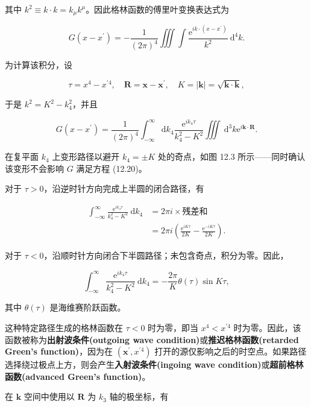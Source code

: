 其中
$k^{2} \equiv k \cdot k = k_{\mu} k^{\mu}$。因此格林函数的傅里叶变换表达式为

\begin{equation}\label{eq:12.21} 
 G\left(x-x^{\prime}\right)=-\frac{1}{(2 \pi)^{4}} \iiint \int \frac{\mathrm{e}^{i k \cdot\left(x-x^{\prime}\right)}}{k^{2}} \mathrm{~d}^{4} k. 
 \end{equation}

为计算该积分，设

$$
\tau=x^{4}-x^{\prime 4}, \quad \mathbf{R}=\mathbf{x}-\mathbf{x}^{\prime}, \quad K=|\mathbf{k}|=\sqrt{\mathbf{k} \cdot \mathbf{k}},
$$

于是 $k^{2}=K^{2}-k_{4}^{2}$，并且

$$
G\left(x-x^{\prime}\right)=\frac{1}{(2 \pi)^{4}} \int_{-\infty}^{\infty} \mathrm{d} k_{4} \frac{\mathrm{e}^{i k_{4} \tau}}{k_{4}^{2}-K^{2}} \iiint \mathrm{~d}^{3} k \mathrm{e}^{i \mathbf{k} \cdot \mathbf{R}}.
$$

在复平面 $k_{4}$ 上变形路径以避开 $k_{4}=\pm K$ 处的奇点，如图 12.3
所示------同时确认该变形不会影响 $G$ 满足方程 (12.20)。

对于 $\tau>0$，沿逆时针方向完成上半圆的闭合路径，有

$$
\begin{aligned}
\int_{-\infty}^{\infty} \frac{\mathrm{e}^{i k_{4} \tau}}{k_{4}^{2}-K^{2}} \mathrm{~d} k_{4} & =2 \pi i \times \text{残差和} \\
& =2 \pi i\left(\frac{\mathrm{e}^{i K \tau}}{2 K}-\frac{\mathrm{e}^{-i K \tau}}{2 K}\right).
\end{aligned}
$$

对于
$\tau<0$，沿顺时针方向闭合下半圆路径；未包含奇点，积分为零。因此，

$$
\int_{-\infty}^{\infty} \frac{\mathrm{e}^{i k_{4} \tau}}{k_{4}^{2}-K^{2}} \mathrm{~d} k_{4}=-\frac{2 \pi}{K} \theta(\tau) \sin K \tau,
$$

其中 $\theta(\tau)$ 是海维赛阶跃函数。

这种特定路径生成的格林函数在 $\tau<0$ 时为零，即当
$x^{4}<x^{\prime 4}$
时为零。因此，该函数被称为\textbf{出射波条件(outgoing wave condition)}或\textbf{推迟格林函数(retarded Green's function)}，因为在
$\left(\mathbf{x}^{\prime}, x^{\prime 4}\right)$
打开的源仅影响之后的时空点。如果路径选择绕过极点上方，则会产生\textbf{入射波条件(ingoing wave condition)}或\textbf{超前格林函数(advanced Green's
function)}。

在 $\mathbf{k}$ 空间中使用以 $\mathbf{R}$ 为 $k_{3}$
轴的极坐标，有

